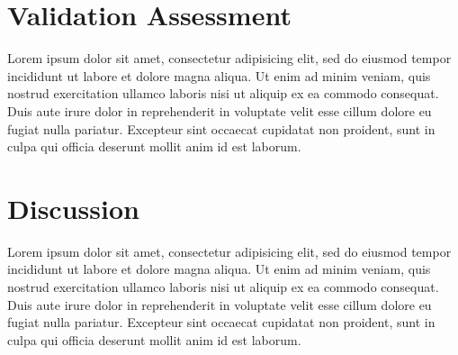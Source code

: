 \documentclass[11pt, a4paper]{article}
\begin{document}
\section{Validation Assessment}

Lorem ipsum dolor sit amet, consectetur adipisicing elit, sed do eiusmod tempor incididunt ut labore et dolore magna aliqua. Ut enim ad minim veniam, quis nostrud exercitation ullamco laboris nisi ut aliquip ex ea commodo consequat. Duis aute irure dolor in reprehenderit in voluptate velit esse cillum dolore eu fugiat nulla pariatur. Excepteur sint occaecat cupidatat non proident, sunt in culpa qui officia deserunt mollit anim id est laborum.

\section{Discussion}

Lorem ipsum dolor sit amet, consectetur adipisicing elit, sed do eiusmod tempor incididunt ut labore et dolore magna aliqua. Ut enim ad minim veniam, quis nostrud exercitation ullamco laboris nisi ut aliquip ex ea commodo consequat. Duis aute irure dolor in reprehenderit in voluptate velit esse cillum dolore eu fugiat nulla pariatur. Excepteur sint occaecat cupidatat non proident, sunt in culpa qui officia deserunt mollit anim id est laborum.
\end{document}
